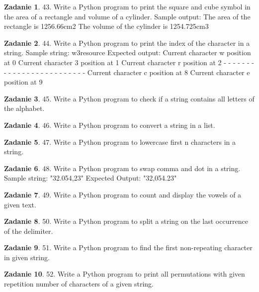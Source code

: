 \documentclass[11pt]{article}
\theoremstyle{definition}
\newtheorem{zadanie}{Zadanie}
\begin{document}
\begin{zadanie}
43. Write a Python program to print the square and cube symbol in the area of a rectangle and volume of a cylinder.
Sample output:
The area of the rectangle is 1256.66cm2
The volume of the cylinder is 1254.725cm3
\end{zadanie}

\begin{zadanie}
44. Write a Python program to print the index of the character in a string.
Sample string: w3resource
Expected output:
Current character w position at 0
Current character 3 position at 1
Current character r position at 2
- - - - - - - - - - - - - - - - - - - - - - - - -
Current character c position at 8
Current character e position at 9
\end{zadanie}

\begin{zadanie}
45. Write a Python program to check if a string contains all letters of the alphabet.
\end{zadanie}

\begin{zadanie}
46. Write a Python program to convert a string in a list.
\end{zadanie}

\begin{zadanie}
47. Write a Python program to lowercase first n characters in a string.
\end{zadanie}

\begin{zadanie}
48. Write a Python program to swap comma and dot in a string.
Sample string: "32.054,23"
Expected Output: "32,054.23"
\end{zadanie}

\begin{zadanie}
49. Write a Python program to count and display the vowels of a given text.
\end{zadanie}

\begin{zadanie}
50. Write a Python program to split a string on the last occurrence of the delimiter.
\end{zadanie}

\begin{zadanie}
51. Write a Python program to find the first non-repeating character in given string.
\end{zadanie}

\begin{zadanie}
52. Write a Python program to print all permutations with given repetition number of characters of a given string.
\end{zadanie}
\end{document}
